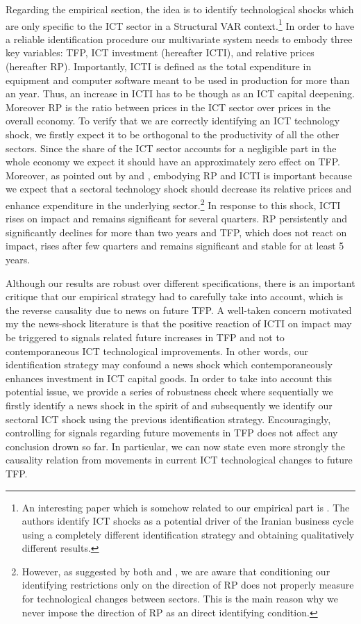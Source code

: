 \documentclass[12pt]{article}
\begin{document}
Regarding the empirical section, the idea is to identify technological shocks which are only specific to the ICT sector in a Structural VAR context.\footnote{An interesting paper which is somehow related to our empirical part is \cite{jafari2012impact}. The authors identify ICT shocks as a potential driver of the Iranian business cycle using a completely different identification strategy and obtaining qualitatively different results.} In order to have a reliable identification procedure our multivariate system needs to embody three key variables: TFP, ICT investment (hereafter ICTI), and relative prices (hereafter RP). Importantly, ICTI is defined as the total expenditure in equipment and computer software meant to be used in production for more than an year. Thus, an increase in ICTI has to be though as an ICT capital deepening. Moreover RP is the ratio between prices in the ICT sector over prices in the overall economy. To verify that we are correctly identifying an ICT technology shock, we firstly expect it to be orthogonal to the productivity of all the other sectors. Since the share of the ICT sector accounts for a negligible part in the whole economy we expect it should have an approximately zero effect on TFP. Moreover, as pointed out by \cite{greenwood1997long} and \cite{fisher2006dynamic}, embodying RP and ICTI is important because we expect that a sectoral technology shock should decrease its relative prices and enhance expenditure in the underlying sector.\footnote{However, as suggested by both \cite{greenwood2000role} and \cite{basu2010sector}, we are aware that conditioning our identifying restrictions only on the direction of RP does not properly measure for technological changes between sectors. This is the main reason why we never impose the direction of RP as an direct identifying condition.} In response to this shock, ICTI rises on impact and remains significant for several quarters. RP persistently and significantly declines for more than two years and TFP, which does not react on impact, rises after few quarters and remains significant and stable for at least 5 years. 

Although our results are robust over different specifications, there is an important critique that our empirical strategy had to carefully take into account, which is the reverse causality due to news on future TFP. A well-taken concern motivated my the news-shock literature is that the positive reaction of ICTI on impact may be triggered to signals related future increases in TFP and not to contemporaneous ICT technological improvements. In other words, our identification strategy may confound a news shock which contemporaneously enhances investment in ICT capital goods. In order to take into account this potential issue, we provide a series of robustness check where sequentially we firstly identify a news shock in the spirit of \cite{barsky2011news} and subsequently we identify our sectoral ICT shock using the previous identification strategy. Encouragingly, controlling for signals regarding future movements in TFP does not affect any conclusion drown so far. In particular, we can now state even more strongly the causality relation from movements in current ICT technological changes to future TFP. 
\end{document}
